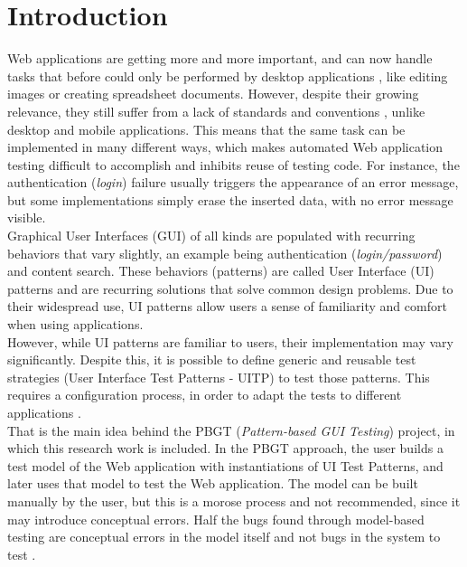 \documentclass[conference]{IEEEtran}
\begin{document}
\IEEEpeerreviewmaketitle

\section{Introduction}\label{sec:intro}

Web applications are getting more and more important, and can now handle tasks that before could only be performed by desktop applications \cite{garrett2005ajax}, like editing images or creating spreadsheet documents. However, despite their growing relevance, they still suffer from a lack of standards and conventions \cite{constantine2002usage}, unlike desktop and mobile applications. This means that the same task can be implemented in many different ways, which makes automated Web application testing difficult to accomplish and inhibits reuse of testing code. For instance, the authentication (\textit{login}) failure usually triggers the appearance of an error message, but some implementations simply erase the inserted data, with no error message visible.\\


Graphical User Interfaces (GUI) of all kinds are populated with recurring behaviors that vary slightly, an example being authentication (\textit{login/password}) and content search. These behaviors (patterns) are called User Interface (UI) patterns \cite{van2001patterns} and are recurring solutions that solve common design problems. Due to their widespread use, UI patterns allow users a sense of familiarity and comfort when using applications. \\

However, while UI patterns are familiar to users, their implementation may vary significantly.  Despite this, it is possible to define generic and reusable test strategies (User Interface Test Patterns - UITP) to test those patterns. This requires a configuration process, in order to adapt the tests to different applications \cite{morgado2012gui}. \\

That is the main idea behind the PBGT (\textit{Pattern-based GUI Testing}) project, in which this research work is included. In the PBGT approach, the user builds a test model of the Web application with instantiations of UI Test Patterns, and later uses that model to test the Web application. The model can be built manually by the user, but this is a morose process and not recommended, since it may introduce conceptual errors. Half the bugs found through model-based testing are conceptual errors in the model itself and not bugs in the system to test \cite{dalal1999model}.\\
\end{document}
